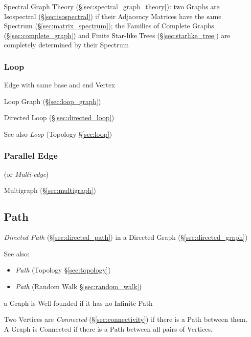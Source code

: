 Spectral Graph Theory (\S\ref{sec:spectral_graph_theory}): two Graphs are
Isospectral (\S\ref{sec:isospectral}) if their Adjacency Matrices have the same
Spectrum (\S\ref{sec:matrix_spectrum}); the Families of Complete Graphs
(\S\ref{sec:complete_graph}) and Finite Star-like Trees
(\S\ref{sec:starlike_tree}) are completely determined by their Spectrum



\subsubsection{Loop}\label{sec:graph_loop}

Edge with same base and end Vertex

Loop Graph (\S\ref{sec:loop_graph})

Directed Loop (\S\ref{sec:directed_loop})

\fist See also \emph{Loop} (Topology \S\ref{sec:loop})



\subsubsection{Parallel Edge}\label{sec:parallel_edge}

(or \emph{Multi-edge})

Multigraph (\S\ref{sec:multigraph})



\subsection{Path}\label{sec:graph_path}

\emph{Directed Path} (\S\ref{sec:directed_path}) in a Directed Graph
(\S\ref{sec:directed_graph})

\fist See also:
\begin{itemize}
  \item \emph{Path} (Topology \S\ref{sec:topology})
  \item \emph{Path} (Random Walk \S\ref{sec:random_walk})
\end{itemize}

a Graph is Well-founded if it has no Infinite Path

Two Vertices are \emph{Connected} (\S\ref{sec:connectivity}) if there
is a Path between them. A Graph is Connected if there is a Path
between all pairs of Vertices.



